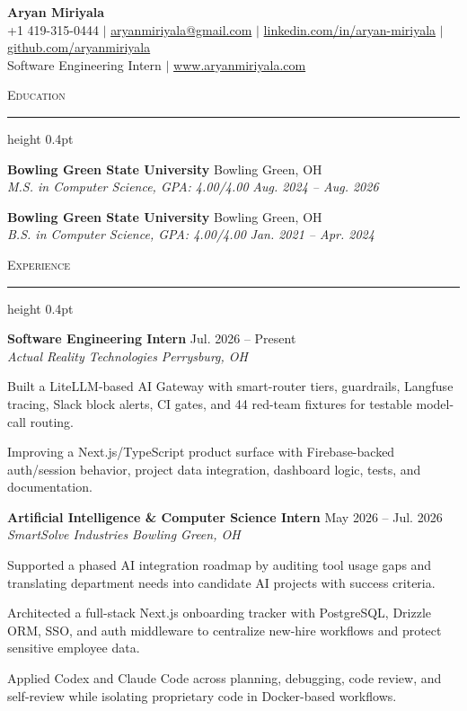\documentclass[letterpaper,11pt]{article}
\newcommand{\resumesection}[1]{%
  \par\vspace{2pt}%
  {\large\scshape #1}\par\vspace{2pt}%
  \hrule height 0.4pt\vspace{2pt}%
}
\newcommand{\resumeSubheading}[4]{
  \textbf{#1} \hfill #2\\
  \textit{#3} \hfill \textit{#4}
}
\begin{document}
\begin{center}
  {\LARGE \textbf{Aryan Miriyala}}\\[-1pt]
  \small
  +1 419-315-0444 $|$
  \href{mailto:aryanmiriyala@gmail.com}{aryanmiriyala@gmail.com} $|$
  \href{https://www.linkedin.com/in/aryan-miriyala-7788a21b6/}{linkedin.com/in/aryan-miriyala} $|$
  \href{https://github.com/aryanmiriyala}{github.com/aryanmiriyala}\\[-1pt]
  Software Engineering Intern $|$
  \href{https://www.aryanmiriyala.com}{www.aryanmiriyala.com}
\end{center}\vspace{-10pt}

\resumesection{Education}
\resumeSubheading
{Bowling Green State University}{Bowling Green, OH}
{M.S. in Computer Science, GPA: 4.00/4.00}{Aug. 2024 -- Aug. 2026}

\resumeSubheading
{Bowling Green State University}{Bowling Green, OH}
{B.S. in Computer Science, GPA: 4.00/4.00}{Jan. 2021 -- Apr. 2024}

\resumesection{Experience}
\resumeSubheading
{Software Engineering Intern}{Jul. 2026 -- Present}
{Actual Reality Technologies}{Perrysburg, OH}
\begin{tightitemize}
  \item Built a LiteLLM-based AI Gateway with smart-router tiers, guardrails, Langfuse tracing, Slack block alerts, CI gates, and 44 red-team fixtures for testable model-call routing.
  \item Improving a Next.js/TypeScript product surface with Firebase-backed auth/session behavior, project data integration, dashboard logic, tests, and documentation.
\end{tightitemize}

\resumeSubheading
{Artificial Intelligence \& Computer Science Intern}{May 2026 -- Jul. 2026}
{SmartSolve Industries}{Bowling Green, OH}
\begin{tightitemize}
  \item Supported a phased AI integration roadmap by auditing tool usage gaps and translating department needs into candidate AI projects with success criteria.
  \item Architected a full-stack Next.js onboarding tracker with PostgreSQL, Drizzle ORM, SSO, and auth middleware to centralize new-hire workflows and protect sensitive employee data.
  \item Applied Codex and Claude Code across planning, debugging, code review, and self-review while isolating proprietary code in Docker-based workflows.
\end{tightitemize}
\end{document}
